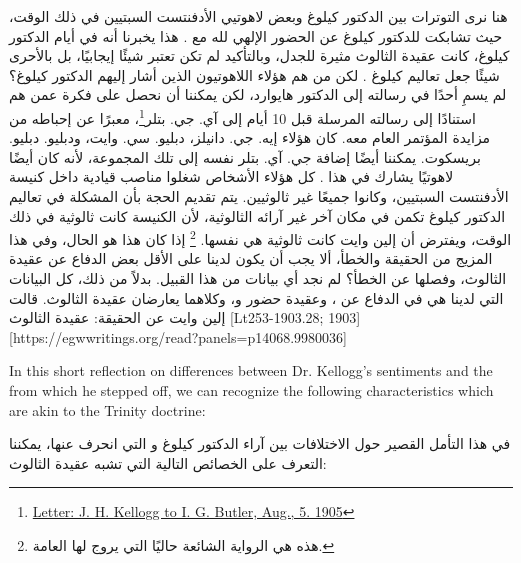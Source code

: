 هنا نرى التوترات بين الدكتور كيلوغ وبعض لاهوتيي الأدفنتست السبتيين في ذلك الوقت، حيث تشابكت  للدكتور كيلوغ عن الحضور الإلهي لله مع . هذا يخبرنا أنه في أيام الدكتور كيلوغ، كانت عقيدة الثالوث مثيرة للجدل، وبالتأكيد لم تكن تعتبر شيئًا إيجابيًا، بل بالأحرى شيئًا جعل تعاليم كيلوغ . لكن من هم هؤلاء اللاهوتيون الذين أشار إليهم الدكتور كيلوغ؟ لم يسمِ أحدًا في رسالته إلى الدكتور هايوارد، لكن يمكننا أن نحصل على فكرة عمن هم  استنادًا إلى رسالته المرسلة قبل 10 أيام إلى آي. جي. بتلر\footnote{\href{https://forgotten-pillar.s3.us-east-2.amazonaws.com/1905-08-05-kellogg-butler.pdf}{Letter: J. H. Kellogg to I. G. Butler, Aug., 5. 1905}}، معبرًا عن إحباطه من مزايدة المؤتمر العام معه. كان هؤلاء إيه. جي. دانيلز، دبليو. سي. وايت، ودبليو. دبليو. بريسكوت. يمكننا أيضًا إضافة جي. آي. بتلر نفسه إلى تلك المجموعة، لأنه كان أيضًا لاهوتيًا يشارك في هذا . كل هؤلاء الأشخاص شغلوا مناصب قيادية داخل كنيسة الأدفنتست السبتيين، وكانوا جميعًا غير ثالوثيين. يتم تقديم الحجة بأن المشكلة في تعاليم الدكتور كيلوغ تكمن في مكان آخر غير آرائه الثالوثية، لأن الكنيسة كانت ثالوثية في ذلك الوقت، ويفترض أن إلين وايت كانت ثالوثية هي نفسها. \footnote{هذه هي الرواية الشائعة حاليًا التي يروج لها العامة.} إذا كان هذا هو الحال، وفي هذا المزيج من الحقيقة والخطأ، ألا يجب أن يكون لدينا على الأقل بعض الدفاع عن عقيدة الثالوث، وفصلها عن الخطأ؟ لم نجد أي بيانات من هذا القبيل. بدلاً من ذلك، كل البيانات التي لدينا هي في الدفاع عن ، وعقيدة حضور و، وكلاهما يعارضان عقيدة الثالوث. قالت إلين وايت عن الحقيقة: عقيدة الثالوث [Lt253-1903.28; 1903][https://egwwritings.org/read?panels=p14068.9980036]


In this short reflection on differences between Dr. Kellogg's sentiments and the  from which he stepped off, we can recognize the following characteristics which are akin to the Trinity doctrine:


في هذا التأمل القصير حول الاختلافات بين آراء الدكتور كيلوغ و التي انحرف عنها، يمكننا التعرف على الخصائص التالية التي تشبه عقيدة الثالوث:


